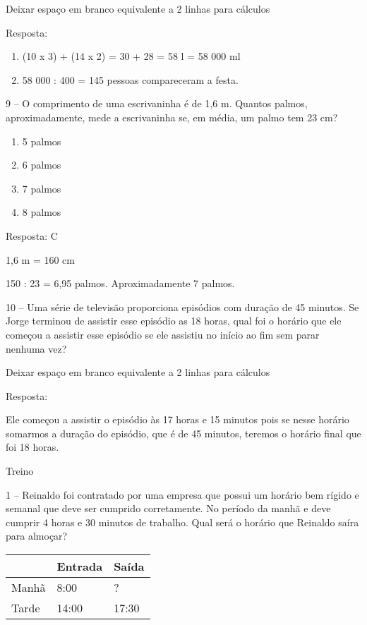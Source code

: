 Deixar espaço em branco equivalente a 2 linhas para cálculos

Resposta:

\begin{enumerate}
\def\labelenumi{\alph{enumi})}
\item
  (10 x 3) + (14 x 2) = 30 + 28 = 58 l = 58 000 ml
\item
  58 000 : 400 = 145 pessoas compareceram a festa.
\end{enumerate}

9 -- O comprimento de uma escrivaninha é de 1,6 m. Quantos palmos,
aproximadamente, mede a escrivaninha se, em média, um palmo tem 23 cm?

\begin{enumerate}
\def\labelenumi{\alph{enumi})}
\item
  5 palmos
\item
  6 palmos
\item
  7 palmos
\item
  8 palmos
\end{enumerate}

Resposta: C

1,6 m = 160 cm

150 : 23 = 6,95 palmos. Aproximadamente 7 palmos.

10 -- Uma série de televisão proporciona episódios com duração de 45
minutos. Se Jorge terminou de assistir esse episódio as 18 horas, qual
foi o horário que ele começou a assistir esse episódio se ele assistiu
no início ao fim sem parar nenhuma vez?

Deixar espaço em branco equivalente a 2 linhas para cálculos

Resposta:

Ele começou a assistir o episódio às 17 horas e 15 minutos pois se nesse
horário somarmos a duração do episódio, que é de 45 minutos, teremos o
horário final que foi 18 horas.

Treino

1 -- Reinaldo foi contratado por uma empresa que possui um horário bem
rígido e semanal que deve ser cumprido corretamente. No período da manhã
e deve cumprir 4 horas e 30 minutos de trabalho. Qual será o horário que
Reinaldo saíra para almoçar?

\begin{longtable}[]{@{}lll@{}}
\toprule
& Entrada & Saída\tabularnewline
\midrule
\endhead
Manhã & 8:00 & ?\tabularnewline
Tarde & 14:00 & 17:30\tabularnewline
\bottomrule
\end{longtable}

